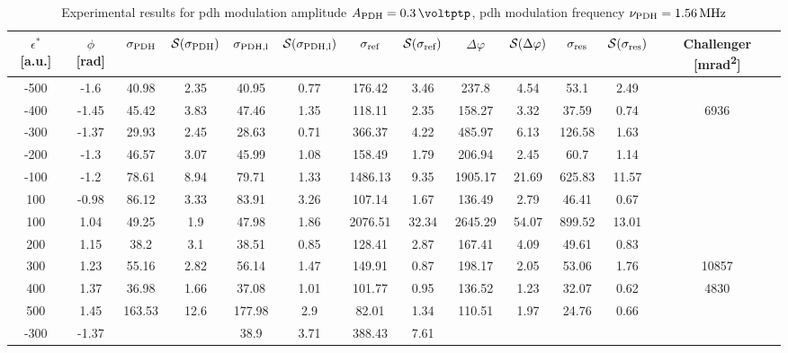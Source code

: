 \begin{landscape}
	
	\begin{table}
	\centering
	\begin{tabular}{|c|c|c|c|c|c|c|c|c|c|c|c|c|}
		\hline
		$\epsilon^*$ [a.u.] & $\phi$ [\si{\radian}] & $\sigma_{\text{PDH}}$ & $\mathcal{S}(\sigma_{\text{PDH}})$ & $\sigma_{\text{PDH,l}}$ & $\mathcal{S}(\sigma_{\text{PDH,l}})$  & $\sigma_{\text{ref}}$ & $\mathcal{S}(\sigma_{\text{ref}})$ & $\Delta \varphi$ & $\mathcal{S}(\Delta \varphi)$ & $\sigma_{\text{res}}$  & $\mathcal{S}(\sigma_{\text{res}})$ & Challenger [\si{\milli\radian\squared}] \\
		\hline
		\hline
		-500 & -1.6 & 40.98 & 2.35 & 40.95 & 0.77 & 176.42 & 3.46 & 237.8 & 4.54 & 53.1 & 2.49 & \\
		-400 & -1.45 & 45.42 & 3.83 & 47.46 & 1.35 & 118.11 & 2.35 & 158.27 & 3.32 & 37.59 & 0.74 & 6936\\
		-300 & -1.37 & 29.93 & 2.45 & 28.63 & 0.71 & 366.37 & 4.22 & 485.97 & 6.13 & 126.58 & 1.63 & \\
		-200 & -1.3 & 46.57 & 3.07 & 45.99 & 1.08 & 158.49 & 1.79 & 206.94 & 2.45 & 60.7 & 1.14 & \\
		-100 & -1.2 & 78.61 & 8.94 & 79.71 & 1.33 & 1486.13 & 9.35 & 1905.17 & 21.69 & 625.83 & 11.57 & \\
		100 & -0.98 & 86.12 & 3.33 & 83.91 & 3.26 & 107.14 & 1.67 & 136.49 & 2.79 & 46.41 & 0.67 & \\
		100 & 1.04 & 49.25 & 1.9 & 47.98 & 1.86 & 2076.51 & 32.34 & 2645.29 & 54.07 & 899.52 & 13.01 & \\
		200 & 1.15 & 38.2 & 3.1 & 38.51 & 0.85 & 128.41 & 2.87 & 167.41 & 4.09 & 49.61 & 0.83 & \\
		300 & 1.23 & 55.16 & 2.82 & 56.14 & 1.47 & 149.91 & 0.87 & 198.17 & 2.05 & 53.06 & 1.76 & 10857\\
		400 & 1.37 & 36.98 & 1.66 & 37.08 & 1.01 & 101.77 & 0.95 & 136.52 & 1.23 & 32.07 & 0.62 & 4830\\
		500 & 1.45 & 163.53 & 12.6 & 177.98 & 2.9 & 82.01 & 1.34 & 110.51 & 1.97 & 24.76 & 0.66 & \\
		\hline
		\hline
		-300 & -1.37 & & & 38.9 & 3.71 & 388.43 & 7.61 & & & & & \\
		\hline
	\end{tabular}
	\caption{Experimental results for \gls{pdh} modulation amplitude $\tind{A}{PDH} = \SI{0.3}{\voltptp}$, \gls{pdh} modulation frequency $\nu_{\text{PDH}} = \SI{1.56}{\mega\hertz}$}
	\end{table}
	

\end{landscape}
